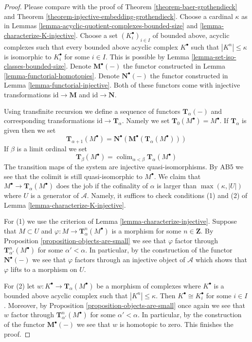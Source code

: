 \documentclass{stacks-project}
\theoremstyle{plain}
\theoremstyle{definition}
\theoremstyle{remark}
\numberwithin{equation}{subsection}
\def\colim{\mathop{\mathrm{colim}}\nolimits}
\begin{document}
\begin{proof}
Please compare with the proof of
Theorem \ref{theorem-baer-grothendieck}
and
Theorem \ref{theorem-injective-embedding-grothendieck}.
Choose a cardinal $\kappa$ as in
Lemmas \ref{lemma-acyclic-quotient-complexes-bounded-size} and
\ref{lemma-characterize-K-injective}.
Choose a set $(K_i^\bullet)_{i \in I}$
of bounded above, acyclic complexes
such that every bounded above acyclic complex $K^\bullet$
such that $|K^n| \leq \kappa$ is isomorphic to $K_i^\bullet$ for some
$i \in I$. This is possible by
Lemma \ref{lemma-set-iso-classes-bounded-size}.
Denote $\mathbf{M}^\bullet(-)$ the functor constructed in
Lemma \ref{lemma-functorial-homotopies}.
Denote $\mathbf{N}^\bullet(-)$ the functor constructed in
Lemma \ref{lemma-functorial-injective}.
Both of these functors come with injective transformations
$\text{id} \to \mathbf{M}$ and $\text{id} \to \mathbf{N}$.

\medskip\noindent
Using transfinite recursion we define a sequence of functors
$\mathbf{T}_\alpha(-)$ and corresponding transformations
$\text{id} \to \mathbf{T}_\alpha$. Namely we set
$\mathbf{T}_0(M^\bullet) = M^\bullet$. If $\mathbf{T}_\alpha$ is
given then we set
$$
\mathbf{T}_{\alpha + 1}(M^\bullet) =
\mathbf{N}^\bullet(\mathbf{M}^\bullet(\mathbf{T}_\alpha(M^\bullet)))
$$
If $\beta$ is a limit ordinal we set
$$
\mathbf{T}_\beta(M^\bullet) =
\colim_{\alpha < \beta} \mathbf{T}_\alpha(M^\bullet)
$$
The transition maps of the system are injective quasi-isomorphisms.
By AB5 we see that the colimit is still quasi-isomorphic to $M^\bullet$.
We claim that $M^\bullet \to \mathbf{T}_\alpha(M^\bullet)$
does the job if the cofinality of $\alpha$ is larger than
$\max(\kappa, |U|)$ where $U$ is a generator of $\mathcal{A}$.
Namely, it suffices to check conditions (1) and (2) of
Lemma \ref{lemma-characterize-K-injective}.

\medskip\noindent
For (1) we use the criterion of
Lemma \ref{lemma-characterize-injective}.
Suppose that $M \subset U$ and $\varphi : M \to \mathbf{T}^n_\alpha(M^\bullet)$
is a morphism for some $n \in \mathbf{Z}$. By
Proposition \ref{proposition-objects-are-small}
we see that $\varphi$ factor through
$\mathbf{T}^n_{\alpha'}(M^\bullet)$ for some $\alpha' < \alpha$.
In particular, by the construction of the functor
$\mathbf{N}^\bullet(-)$ we see that $\varphi$ factors through
an injective object of $\mathcal{A}$ which shows that $\varphi$
lifts to a morphism on $U$.

\medskip\noindent
For (2) let $w : K^\bullet  \to \mathbf{T}_\alpha(M^\bullet)$
be a morphism of complexes where $K^\bullet$ is a bounded above acyclic
complex such that $|K^n| \leq \kappa$. Then $K^\bullet \cong K_i^\bullet$
for some $i \in I$. Moreover, by
Proposition \ref{proposition-objects-are-small}
once again we see that $w$ factor through
$\mathbf{T}^n_{\alpha'}(M^\bullet)$ for some $\alpha' < \alpha$.
In particular, by the construction of the functor
$\mathbf{M}^\bullet(-)$ we see that $w$ is homotopic to zero.
This finishes the proof.
\end{proof}
\end{document}
